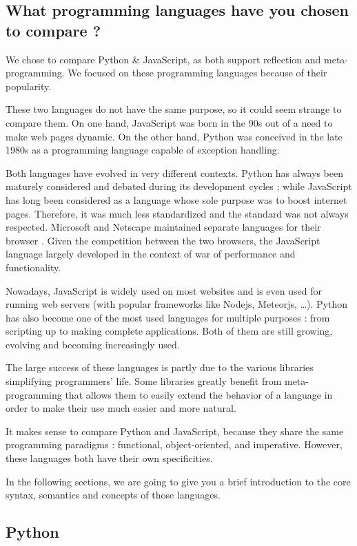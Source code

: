 \documentclass[a4paper,10pt]{article}
\begin{document}
\subsection{What programming languages have you chosen to compare ?}

We chose to compare Python \& JavaScript, as both support reflection and meta-programming.
We focused on these programming languages because of their popularity.

These two languages do not have the same purpose, so it could seem strange to compare them.
On one hand, JavaScript was born in the 90s out of a need to make web pages dynamic.
On the other hand, Python was conceived in the late 1980s as a programming language capable of exception handling.

Both languages have evolved in very different contexts.
Python has always been maturely considered and debated during its development cycles \cite{ wiki:python}; while JavaScript has long been considered as a language whose sole purpose was to boost internet pages.
Therefore, it was much less standardized and the standard was not always respected.
Microsoft and Netscape maintained separate languages for their browser \cite{wiki:javascript}.
Given the competition between the two browsers, the JavaScript language largely developed in the context of war of performance and functionality.

Nowadays, JavaScript is widely used on most websites and is even used for running web servers (with popular frameworks like Nodejs, Meteorjs, \dots).
Python has also become one of the most used languages for multiple purposes : from scripting up to making complete applications.
Both of them are still growing, evolving and becoming increasingly used.

The large success of these languages is partly due to the various libraries simplifying  programmers' life.
Some libraries greatly benefit from meta-programming that allows them to easily extend the behavior of a language in order to make their use much easier and more natural.

It makes sense to compare Python and JavaScript, because they share the same programming paradigms : functional, object-oriented, and imperative.
However, these languages both have their own specificities.

In the following sections, we are going to give you a brief introduction to the core syntax, semantics and concepts of those languages.

\subsection{Python}
\setpy
\end{document}
